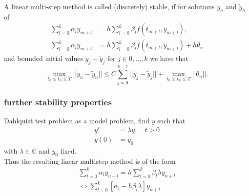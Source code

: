 	\begin{frame}
		\begin{definition} \label{discrete stability LMSM}
			A linear multi-step method is called (discretely) stable, if for solutions $y_h$ and $\tilde{y}_h$ of
			\begin{align}
				\sum_{l=0}^{k} \alpha_l y_{m+l} &= h \sum_{l=0}^{k} \beta_l f(t_{m+l}, y_{m+l}), \\
				\sum_{l=0}^{k} \alpha_l \tilde{y}_{m+l} &= h \sum_{l=0}^{k} \beta_l f(t_{m+l}, \tilde{y}_{m+l}) + h\theta_n
			\end{align} 
			and bounded initial values $y_j - \tilde{y}_j$ for $j \in {0,...,k}$ we have that
			\begin{displaymath}
				\max_{t_0 \leq t_n \leq T} ||y_n - \tilde{y}_n|| \leq C \sum_{j=0}^{k-1} ||y_j - \tilde{y}_j|| + \max_{t_0 \leq t_n \leq T} ||\theta_n||.
			\end{displaymath}
		\end{definition}
	\end{frame}
	
	\subsubsection{further stability properties}
	
	\begin{frame}
		Dahlquist test problem as a model problem, find $y$ such that
		\begin{align}
			y' &= \lambda y, \quad t > 0 \\
			y(0) &= y_0
		\end{align}
		with $\lambda \in \mathbb{C}$ and $y_0$ fixed. \\
		Thus the resulting linear multistep method is of the form
		\begin{align*}
			\sum_{l=0}^{k} \alpha_l y_{n+l} = h \sum_{l=0}^{k} \beta_l \lambda y_{n+l} \\
			\iff \sum_{l=0}^{k}  [\alpha_l - h \beta_l \lambda] y_{n+l}
		\end{align*}
	\end{frame}
	
